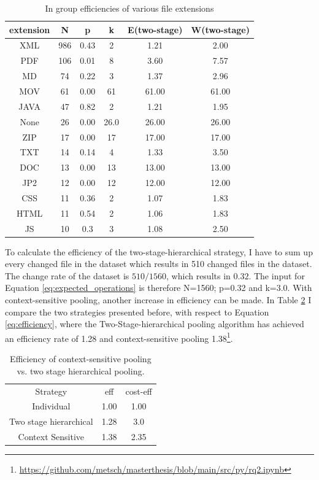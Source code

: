 \begin{table}[t]
    \centering
    \begin{tabular}{ c c c c c c}
        extension & N & p & k & E(\acrshort{two-stage}) & W(\acrshort{two-stage}) \\
        \hline
        XML & 986 & 0.43 & 2 & 1.21  & 2.00 \\  
        \hline
        PDF &106 &0.01 & 8 &  3.60 & 7.57 \\
        \hline
        MD & 74 & 0.22  & 3 & 1.37 & 2.96 \\    
        \hline
        MOV&61 & 0.00 &  61 & 61.00 & 61.00 \\  
     \hline
     JAVA &47 &0.82 & 2  & 1.21 & 1.95 \\  
     \hline
     None & 26 & 0.00 & 26.0 & 26.00 & 26.00	 \\
     \hline
     ZIP & 17 &0.00 &  17 & 17.00 & 17.00 \\
     \hline
     TXT & 14 & 0.14 &  4 & 1.33 & 3.50 \\ 
     \hline
     DOC & 13 & 0.00 &  13 & 13.00 & 13.00 \\   
     \hline
     JP2 & 12 & 0.00 &  12 & 12.00 & 12.00 \\   
     \hline
     CSS & 11 & 0.36 & 2  & 1.07 & 1.83 \\  
     \hline
     HTML & 11 & 0.54 &  2 & 1.06 & 1.83
     \\   
     \hline
     JS & 10 & 0.3 & 3& 1.08 & 2.50
    \end{tabular}
    \caption{In group efficiencies of various file extensions}
    \label{tb:efficiency}
\end{table}

To calculate the efficiency of the two-stage-hierarchical strategy, I have to sum up every changed file in the dataset which results in 510 changed files in the dataset. The change rate of the dataset is $510/1560$, which results in $0.32$. The input for Equation \ref{eq:expected_operations} is therefore N=1560; p=0.32 and k=3.0.
With context-sensitive pooling, another increase in efficiency can be made. In Table \ref{tb:context-sensitive} I compare the two strategies presented before, with respect to Equation \ref{eq:efficiency}, where the Two-Stage-hierarchical pooling algorithm has achieved an efficiency rate of 1.28 and context-sensitive pooling 1.38\footnote{\url{https://github.com/metsch/masterthesis/blob/main/src/py/rq2.ipynb}}. 
\begin{table}[t]
    \centering
    \begin{tabular}{c c c}
        Strategy & \acrshort{eff} & \acrshort{cost-eff} \\
        Individual & 1.00 & 1.00 \\
        Two stage hierarchical &  1.28 & 3.0\\
        Context Sensitive & 1.38 & 2.35
    \end{tabular}
    \caption{Efficiency of context-sensitive pooling vs. two stage hierarchical pooling.}
    \label{tb:context-sensitive}
\end{table}

